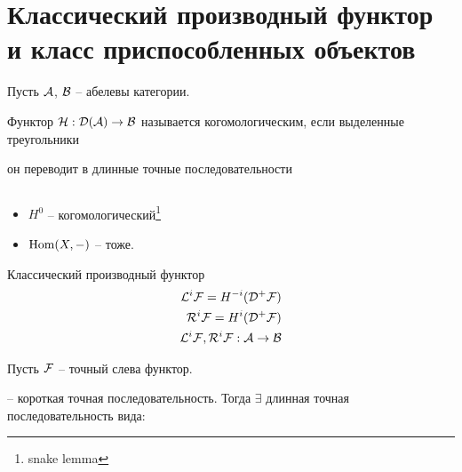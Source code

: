 \documentclass[../main.tex]{subfiles}
\begin{document}
\section{Классический производный функтор и класс приспособленных объектов}
Пусть $\mathcal{A}$, $\mathcal{B}$ -- абелевы категории.
 \begin{to_def}
Функтор $\mathcal{H}: \mathcal{D(A)}\rightarrow\mathcal{B}$ называется когомологическим, если выделенные треугольники  он переводит в длинные точные последовательности
\end{to_def}
\begin{to_ex}
$ $
\begin{itemize}
    \item $H^0$ -- когомологический\footnote{snake lemma}
    \item $\operatorname{Hom}(X, -)$ -- тоже.
\end{itemize}
\end{to_ex}
\begin{to_def}
 \label{classicDerFunc}
Классический производный функтор 
\begin{align*}
    \mathcal{L}^{i}\mathcal{F} = H^{-i}(\mathcal{D^+ F})\\
    \mathcal{R}^{i}\mathcal{F} = H^{i}(\mathcal{D^+ F})\\
    \mathcal{L}^{i}\mathcal{F}, \mathcal{R}^{i}\mathcal{F}: \mathcal{A} \rightarrow \mathcal{B}
\end{align*}
\bee
{}
\eee
\end{to_def}
\begin{to_claim}
Пусть $\mathcal{F}$ -- точный слева функтор.  -- короткая точная последовательность. Тогда $\exists$ длинная точная последовательность вида:
\bee
{}
\eee
\end{to_claim}
\end{document}
